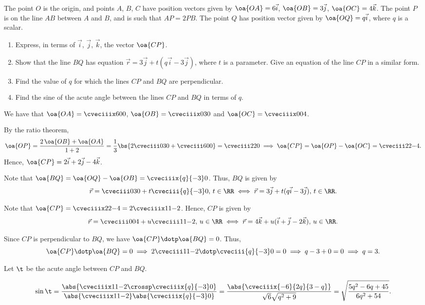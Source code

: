 \begin{problem}
    The point $O$ is the origin, and points $A$, $B$, $C$ have position vectors given by $\oa{OA} = 6\vec i$, $\oa{OB} = 3 \vec j$, $\oa{OC} = 4\vec k$. The point $P$ is on the line $AB$ between $A$ and $B$, and is such that $AP = 2PB$. The point $Q$ has position vector given by $\oa{OQ} = q\vec i$, where $q$ is a scalar.

    \begin{enumerate}
        \item Express, in terms of $\vec i$, $\vec j$, $\vec k$, the vector $\oa{CP}$.
        \item Show that the line $BQ$ has equation $\vec r = 3\vec j + t(q \vec i - 3\vec j)$, where $t$ is a parameter. Give an equation of the line $CP$ in a similar form.
        \item Find the value of $q$ for which the lines $CP$ and $BQ$ are perpendicular.
        \item Find the sine of the acute angle between the lines $CP$ and $BQ$ in terms of $q$.
    \end{enumerate}
\end{problem}
\begin{solution}
    We have that $\oa{OA} = \cveciiix600$, $\oa{OB} = \cveciiix030$ and $\oa{OC} = \cveciiix004$.

    \begin{ppart}
        By the ratio theorem, \[\oa{OP} = \frac{2\,\oa{OB} + \oa{OA}}{1 + 2} = \frac13 \bs{2\cveciii030 + \cveciii600} = \cveciii220 \implies \oa{CP} = \oa{OP} - \oa{OC} = \cveciii22{-4}.\] Hence, $\oa{CP} = 2\vec i + 2\vec j - 4\vec k$.
    \end{ppart}
    \begin{ppart}
        Note that $\oa{BQ} = \oa{OQ} - \oa{OB} = \cveciiix{q}{-3}0$. Thus, $BQ$ is given by \[ \vec r = \cveciii030 + t\cveciii{q}{-3}0, \, t \in \RR \iff \vec r = 3\vec j + t(q\vec i - 3\vec j), \, t \in \RR.\]
        
        Note that $\oa{CP} = \cveciiix22{-4} = 2\cveciiix11{-2}$. Hence, $CP$ is given by \[\vec r = \cveciii004 + u\cveciii11{-2}, \, u \in \RR \iff \vec r = 4\vec k + u(\vec i + \vec j - 2\vec k), \, u \in \RR.\]
    \end{ppart}
    \begin{ppart}
        Since $CP$ is perpendicular to $BQ$, we have $\oa{CP} \dotp \oa{BQ} = 0$. Thus, \[\oa{CP} \dotp \oa{BQ} = 0 \implies 2\cveciii11{-2} \dotp \cveciii{q}{-3}0 = 0 \implies q - 3 + 0 = 0 \implies q = 3.\]
    \end{ppart}
    \begin{ppart}
        Let $\t$ be the acute angle between $CP$ and $BQ$. 
        
        \[\sin\t = \frac{\abs{\cveciiix11{-2} \crossp \cveciiix{q}{-3}0}}{\abs{\cveciiix11{-2}} \abs{\cveciiix{q}{-3}0}} = \frac{\abs{\cveciiix{-6}{2q}{3-q}}}{\sqrt6 \sqrt{q^2 + 9}} = \sqrt{\frac{5q^2 - 6q + 45}{6q^2 + 54}}.\]
    \end{ppart}
\end{solution}

